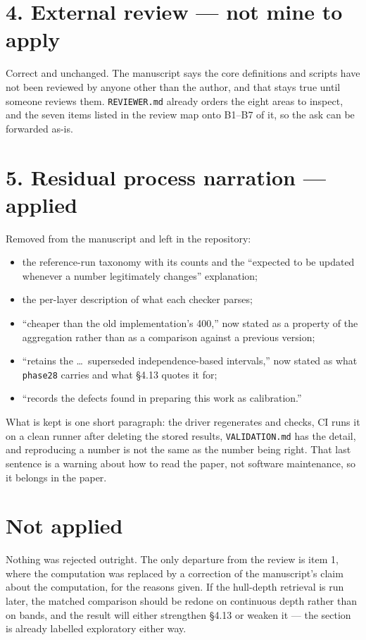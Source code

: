 \documentclass[11pt]{article}
\begin{document}
\section*{4. External review --- not mine to apply}

Correct and unchanged. The manuscript says the core definitions and scripts have not been
reviewed by anyone other than the author, and that stays true until someone reviews them.
\texttt{REVIEWER.md} already orders the eight areas to inspect, and the seven items listed
in the review map onto B1--B7 of it, so the ask can be forwarded as-is.

\section*{5. Residual process narration --- applied}

Removed from the manuscript and left in the repository:

\begin{itemize}
\item the reference-run taxonomy with its counts and the ``expected to be updated whenever
a number legitimately changes'' explanation;
\item the per-layer description of what each checker parses;
\item ``cheaper than the old implementation's 400,'' now stated as a property of the
aggregation rather than as a comparison against a previous version;
\item ``retains the \ldots\ superseded independence-based intervals,'' now stated as what
\texttt{phase28} carries and what \S4.13 quotes it for;
\item ``records the defects found in preparing this work as calibration.''
\end{itemize}

What is kept is one short paragraph: the driver regenerates and checks, CI runs it on a
clean runner after deleting the stored results, \texttt{VALIDATION.md} has the detail, and
reproducing a number is not the same as the number being right. That last sentence is a
warning about how to read the paper, not software maintenance, so it belongs in the paper.

\section*{Not applied}

Nothing was rejected outright. The only departure from the review is item 1, where the
computation was replaced by a correction of the manuscript's claim about the computation,
for the reasons given. If the hull-depth retrieval is run later, the matched comparison
should be redone on continuous depth rather than on bands, and the result will either
strengthen \S4.13 or weaken it --- the section is already labelled exploratory either way.
\end{document}
